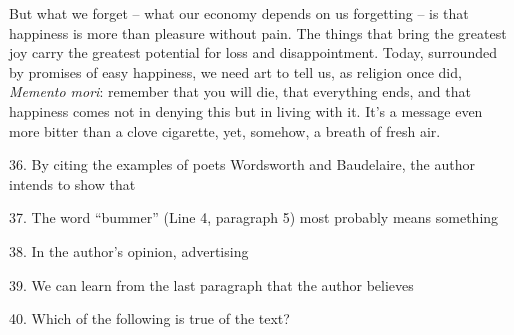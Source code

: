 \qquad But what we forget -- what our economy depends on us forgetting -- is that happiness is more than pleasure without pain. The things that bring the greatest joy carry the greatest potential for loss and disappointment. Today, surrounded by promises of easy happiness, we need art to tell us, as religion once did, \emph{Memento mori}: remember that you will die, that everything ends, and that happiness comes not in denying this but in living with it. It's a message even more bitter than a clove cigarette, yet, somehow, a breath of fresh air.

\vspace{6pt}

36. By citing the examples of poets Wordsworth and Baudelaire, the author intends to show that\par

37. The word ``bummer'' (Line 4, paragraph 5) most probably means something\par

38. In the author's opinion, advertising\par

39. We can learn from the last paragraph that the author believes\par

40. Which of the following is true of the text?\par
